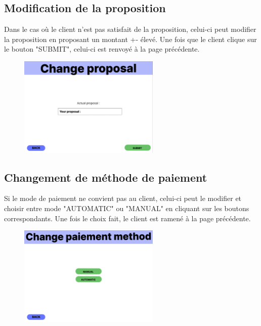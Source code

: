 \subsection{Modification de la proposition}
\begin{flushleft}
Dans le cas où le client n'est pas satisfait de la proposition, celui-ci peut modifier la proposition en proposant un montant +- élevé. Une fois que le client clique sur le bouton "SUBMIT", celui-ci est renvoyé à la page précédente.
\end{flushleft}
\begin{figure}[h]
\centering
\includegraphics[width = 0.6\textwidth]{extension-maxime/interface/img/proposal.png}
\end{figure}

\newpage
\subsection{Changement de méthode de paiement}
\begin{flushleft}
Si le mode de paiement ne convient pas au client, celui-ci peut le modifier et choisir entre mode "AUTOMATIC" ou "MANUAL" en cliquant sur les boutons correspondants. Une fois le choix fait, le client est ramené à la page précédente.
\end{flushleft}
\begin{figure}[h]
\centering
\includegraphics[width = 0.6\textwidth]{extension-maxime/interface/img/paiement-method.png}
\end{figure}

